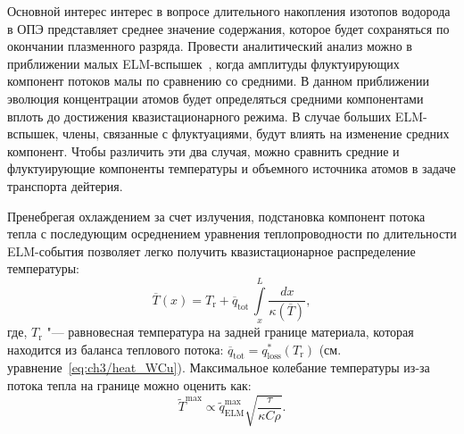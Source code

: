 Основной интерес интерес в вопросе длительного накопления изотопов водорода в ОПЭ представляет среднее значение содержания, которое будет сохраняться по окончании плазменного разряда. Провести аналитический анализ можно в приближении малых ELM-вспышек~\cite{Marenkov2012a}, когда амплитуды флуктуирующих компонент потоков малы по сравнению со средними. В данном приближении эволюция концентрации атомов будет определяться средними компонентами вплоть до достижения квазистационарного режима. В случае больших ELM-вспышек, члены, связанные с флуктуациями, будут влиять на изменение средних компонент. Чтобы различить эти два случая, можно сравнить средние и флуктуирующие компоненты температуры и объемного источника атомов в задаче транспорта дейтерия.

Пренебрегая охлаждением за счет излучения, подстановка компонент потока тепла с последующим осреднением уравнения теплопроводности по длительности ELM-события позволяет легко получить квазистационарное распределение температуры:
\begin{equation}
	\label{eq:ch3/temp_av}
	\overline{T}(x)=T_\mathrm{r}+\overline{q}_{\mathrm{tot}}\,\int\limits_x^L\frac{dx}{\kappa(\overline{T})},
\end{equation}
где, $T_\mathrm{r}$ "--- равновесная температура на задней границе материала, которая находится из баланса теплового потока: $\overline{q}_{\mathrm{tot}}=q_{\mathrm{loss}}^*(T_\mathrm{r})$ (см. уравнение~\cref{eq:ch3/heat_WCu}). Максимальное колебание температуры из-за потока тепла на границе можно оценить как:
\begin{equation}
	\label{eq:ch3/temp_fluct}
	\widetilde{T}^{\max} \propto \widetilde{q}_{\mathrm{ELM}}^{\max} \sqrt{\frac{\tau}{\kappa C \rho}}.
\end{equation} 

